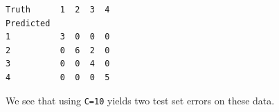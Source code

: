 \documentclass[11pt]{article}
\makeatletter
\newcommand{\boxspacing}{\kern\kvtcb@left@rule\kern\kvtcb@boxsep}
\newcommand{\prompt}[4]{
        {\ttfamily\llap{{\color{#2}[#3]:\hspace{3pt}#4}}\vspace{-\baselineskip}}
    }
\makeatother
\begin{document}
            \begin{tcolorbox}[breakable, size=fbox, boxrule=.5pt, pad at break*=1mm, opacityfill=0]
\prompt{Out}{outcolor}{34}{\boxspacing}
\begin{Verbatim}[commandchars=\\\{\}]
Truth      1  2  3  4
Predicted
1          3  0  0  0
2          0  6  2  0
3          0  0  4  0
4          0  0  0  5
\end{Verbatim}
\end{tcolorbox}
        
    We see that using \texttt{C=10} yields two test set errors on these
data.


    
    
    
\end{document}
